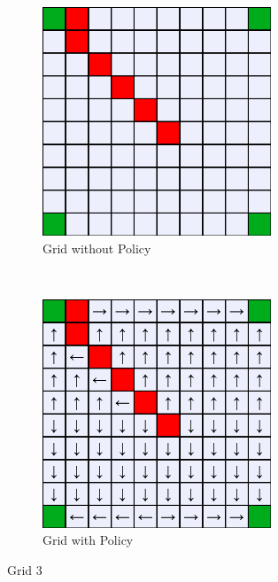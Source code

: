 \documentclass[a4paper, 11pt]{article}
\begin{document}
\begin{figure}[h!]
    \centering
    \begin{subfigure}[t]{0.5\textwidth}
        \centering
        \includegraphics[width=0.75\textwidth]{Images_Q1/grid3_default.png}
        \caption{Grid without Policy}
    \end{subfigure}%
    ~ 
    \begin{subfigure}[t]{0.5\textwidth}
        \centering
        \includegraphics[width=0.75\textwidth]{Images_Q1/grid3.png}
        \caption{Grid with Policy}
    \end{subfigure}
    \caption{Grid 3}
    \label{fig:grid3}
\end{figure}
\end{document}
